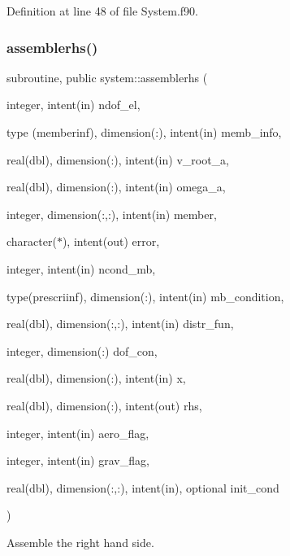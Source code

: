 Definition at line 48 of file System.\+f90.

\mbox{\label{namespacesystem_a442f9666f95d674029a7fbe213b47f8a}} 
\subsubsection{\texorpdfstring{assemblerhs()}{assemblerhs()}}
{\footnotesize\ttfamily subroutine, public system\+::assemblerhs (\begin{DoxyParamCaption}\item[{integer, intent(in)}]{ndof\+\_\+el,  }\item[{type (memberinf), dimension(\+:), intent(in)}]{memb\+\_\+info,  }\item[{real(dbl), dimension(\+:), intent(in)}]{v\+\_\+root\+\_\+a,  }\item[{real(dbl), dimension(\+:), intent(in)}]{omega\+\_\+a,  }\item[{integer, dimension(\+:,\+:), intent(in)}]{member,  }\item[{character($\ast$), intent(out)}]{error,  }\item[{integer, intent(in)}]{ncond\+\_\+mb,  }\item[{type(prescriinf), dimension(\+:), intent(in)}]{mb\+\_\+condition,  }\item[{real(dbl), dimension(\+:,\+:), intent(in)}]{distr\+\_\+fun,  }\item[{integer, dimension(\+:)}]{dof\+\_\+con,  }\item[{real(dbl), dimension(\+:), intent(in)}]{x,  }\item[{real(dbl), dimension(\+:), intent(out)}]{rhs,  }\item[{integer, intent(in)}]{aero\+\_\+flag,  }\item[{integer, intent(in)}]{grav\+\_\+flag,  }\item[{real(dbl), dimension(\+:,\+:), intent(in), optional}]{init\+\_\+cond }\end{DoxyParamCaption})}



Assemble the right hand side. 


